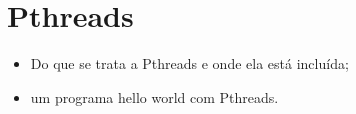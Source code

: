 \section{Pthreads}

	\begin{itemize}
		\item Do que se trata a Pthreads e onde ela está incluída;
		\item um programa hello world com Pthreads.
	\end{itemize}